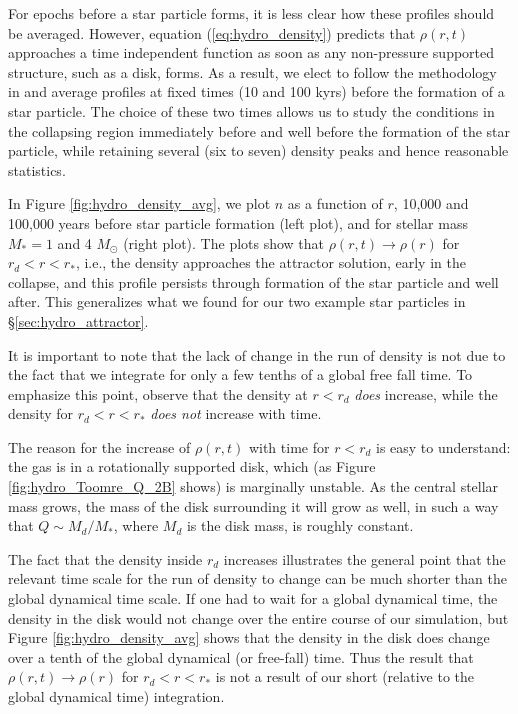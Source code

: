 \documentclass[../dissertation.tex]{subfiles}
\begin{document}
For epochs before a star particle forms, it is less clear how these profiles 
should be averaged.  However, equation (\ref{eq:hydro_density}) predicts that 
$\rho(r,t)$ approaches a time independent function as soon as any 
non-pressure supported structure, such as a disk, forms.
As a result, we elect to follow the methodology in
\citet{2015ApJ...800...49L} and average profiles at fixed times 
(10 and 100 kyrs) before the formation of a star particle.  The 
choice of these two times allows us to study the conditions in the 
collapsing region immediately before and well before the formation of 
the star particle, while retaining several (six to seven) density peaks and hence
reasonable statistics.  

In Figure \ref{fig:hydro_density_avg}, we plot $n$ as a function of 
$r$, 10,000 and 100,000 years before star particle formation (left plot),
and for stellar mass $M_* = 1$ 
and 4 $M_{\odot}$ (right plot). The plots show 
that  $\rho(r,t) \to \rho(r)$ for $r_d< r<r_*$, i.e., the density approaches the attractor solution,
early in the collapse, and this profile persists through formation 
of the star particle and well after. This generalizes what we found for 
our two example star particles in \S \ref{sec:hydro_attractor}.  

It is important to note that the lack of change in the run of density is not due to the fact that we integrate for only a few tenths of a global free fall time. To emphasize this point, observe that the density at $r<r_d$ {\em does} increase, while the density for $r_d< r<r_*$ 
{\em does not} increase with time.

The reason for the increase of $\rho(r,t)$ with time for $r<r_d$ is easy to understand: the gas is in a rotationally supported disk, which (as Figure \ref{fig:hydro_Toomre_Q_2B} shows) is marginally unstable. As the central stellar mass grows, the mass of the disk surrounding it will grow as well, in such a way that $Q\sim M_d/M_*$, where $M_d$ is the disk mass, is roughly constant. 

The fact that the density inside $r_d$ increases illustrates the general point that the relevant time scale for the run of density to change can be much shorter than the global dynamical time scale. If one had to wait for a global dynamical time, the density in the disk would not change over the entire course of our simulation, but Figure \ref{fig:hydro_density_avg} shows that the density in the disk does change over a tenth of the global dynamical (or free-fall) time. Thus the result that $\rho(r,t)\to\rho(r)$ for $r_d< r < r_*$ is not a result of our short (relative to the global dynamical time) integration.
\end{document}
